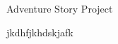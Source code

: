 \documentclass{article}
\begin{document}
\Huge Adventure Story Project

jkdhfjkhdskjafk
\end{document}
